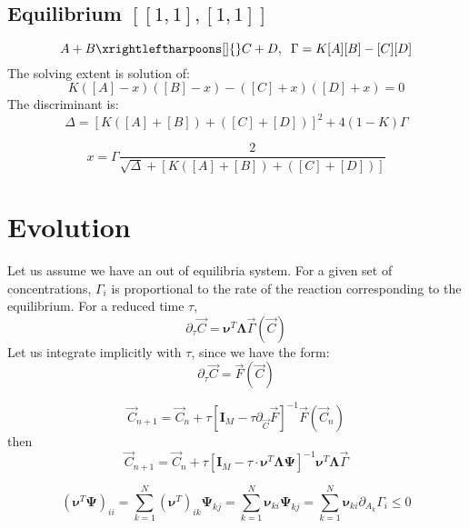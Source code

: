 \documentclass[aps,12pt]{revtex4}
\begin{document}
\subsection{Equilibrium $[ [1,1], [1,1]]$}
\begin{equation}
	A+B \xrightleftharpoons[]{} C+D, \;\; \Gamma = K[A][B] - [C][D]
\end{equation}
The solving extent is solution of:
\begin{equation}
	K([A]-x)([B]-x) - ([C]+x)([D]+x)= 0
\end{equation}
The discriminant is:
\begin{equation}
	\Delta = \left[K([A]+[B])+([C]+[D])\right]^2 + 4 (1-K) \Gamma
\end{equation}

\begin{equation}
x = \Gamma \dfrac{2}{\sqrt{\Delta}+\left[K([A]+[B])+([C]+[D])\right]}
\end{equation}

\section{Evolution}
Let us assume we have an out of equilibria system.
For a given set of concentrations, $\Gamma_i$ is proportional
to the rate of the reaction corresponding to the equilibrium.
For a reduced time $\tau$,
\begin{equation}
	\partial_\tau \vec{C} = \bm{\nu}^T    \bm{\Lambda} \vec{\Gamma}(\vec{C})
\end{equation}
Let us integrate implicitly with $\tau$, since we have the form:
\begin{equation}
	\partial_\tau \vec{C} = \vec{F}(\vec{C})
\end{equation}

\begin{equation}
	\vec{C}_{n+1} = \vec{C}_n +  \tau\left[ \bm{I}_M - \tau \partial_{\vec{C}} \vec{F} \right]^{-1} \vec{F}(\vec{C}_n)
\end{equation}
then
\begin{equation}
	\vec{C}_{n+1} = \vec{C}_n + \tau\left[ \bm{I}_M - \tau  \cdot \bm{\nu}^T   \bm{\Lambda} \bm{\Psi} \right]^{-1}  
	\bm{\nu}^T     \bm{\Lambda} \vec{\Gamma}
\end{equation}


\begin{equation}
	(\bm{\nu}^T \bm{\Psi})_{ii} = \sum_{k=1}^N (\bm{\nu}^T)_{ik} \bm{\Psi}_{kj} =  \sum_{k=1}^N \bm{\nu}_{ki} \bm{\Psi}_{kj}
= \sum_{k=1}^N \bm{\nu}_{ki} \partial_{A_k}\Gamma_i \leq 0
\end{equation}
\end{document}
